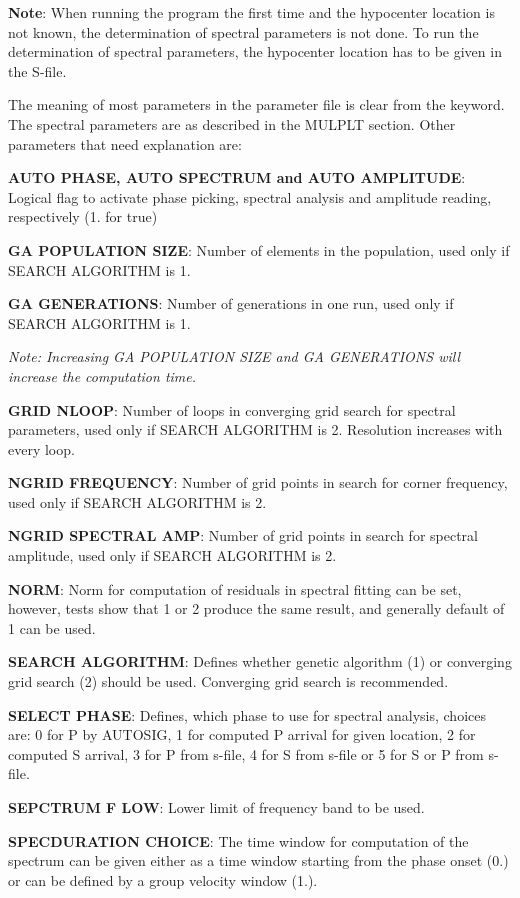 \textbf{Note}: When running the program the first time and the hypocenter location is not known, the determination of spectral parameters is not done. To run the determination of spectral parameters, the hypocenter location has to be given in the S-file. 

The meaning of most parameters in the parameter file is clear from the keyword. The spectral parameters are as described in the MULPLT section. Other parameters that need explanation are: 

\textbf{AUTO PHASE, AUTO SPECTRUM and AUTO AMPLITUDE}: Logical flag to activate phase picking, spectral analysis and amplitude reading, respectively (1. for true) 

\textbf{GA POPULATION SIZE}: Number of elements in the population, used only if SEARCH ALGORITHM is 1. 

\textbf{GA GENERATIONS}: Number of generations in one run, used only if SEARCH ALGORITHM is 1. 

\textit{Note: Increasing GA POPULATION SIZE and GA GENERATIONS will increase the computation time.}

\textbf{GRID NLOOP}: Number of loops in converging grid search for spectral parameters, used only if 
SEARCH ALGORITHM is 2. Resolution increases with every loop. 

\textbf{NGRID FREQUENCY}: Number of grid points in search for corner frequency, used only if SEARCH ALGORITHM is 2. 

\textbf{NGRID SPECTRAL AMP}: Number of grid points in search for spectral amplitude, used only if 
SEARCH ALGORITHM is 2. 

\textbf{NORM}: Norm for computation of residuals in spectral fitting can be set, however, tests show that 1 or 2 produce the same result, and generally default of 1 can be used. 

\textbf{SEARCH ALGORITHM}: Defines whether genetic algorithm (1) or converging grid search (2) should 
be used. Converging grid search is recommended. 

\textbf{SELECT PHASE}: Defines, which phase to use for spectral analysis, choices are: 0 for P by AUTOSIG, 1 for computed P arrival for given location, 2 for computed S arrival, 3 for P from s-file, 4 for S from s-file or 5 for S or P from s-file. 

\textbf{SEPCTRUM F LOW}: Lower limit of frequency band to be used.

\textbf{SPECDURATION CHOICE}: The time window for computation of the spectrum can be given either as a time window starting from the phase onset (0.) or can be defined by a group velocity window (1.). 

